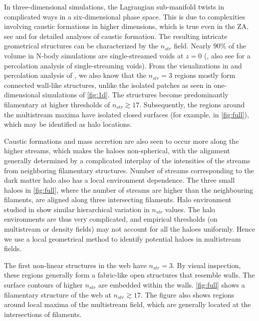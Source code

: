 \documentclass[fleqn,usenatbib,useAMS]{mnras}
\begin{document}
In three-dimensional simulations, the Lagrangian sub-manifold twists in complicated ways in a six-dimensional phase space. This is due to complexities involving caustic formations in higher dimensions, which is true even in the ZA, see \citealt{Arnold1982} and \citealt{Hidding2014} for detailed analyses of caustic formation. The resulting intricate geometrical structures can be characterized by the $n_{str}$ field. Nearly  $90\%$ of the volume in N-body simulations are single-streamed voids at $z=0$ (\citealt{Shandarin2012}, also see \citealt{Falck2015} for a percolation analysis of single-streaming voids). From the visualizations in \cite{Ramachandra2015} and percolation analysis of \cite{Ramachandra2017}, we also know that the $n_{str} = 3$ regions mostly form connected wall-like structures, unlike the isolated patches as seen in one-dimensional simulations of \autoref{fig:1d}. The structures become predominantly filamentary at higher thresholds of $ n_{str} \gtrsim 17$. Subsequently, the regions around the multistream maxima have isolated closed surfaces (for example, in \autoref{fig:full}), which may be identified as halo locations. 

Caustic formations and mass accretion are also seen to occur more along the higher streams, which makes the haloes non-spherical, with the alignment generally determined by a complicated interplay  of the intensities of the streams from neighboring filamentary structures. Number of streams corresponding to the dark matter halo also has a local environment dependence. The three small haloes in \autoref{fig:full}, where the number of streams are higher than the neighbouring filaments, are aligned along three intersecting filaments. Halo environment studied in \cite{Ramachandra2015} show similar hierarchical variation in $n_{str}$ values. The halo environments are thus very complicated, and empirical thresholds (on multistream or density fields) may not account for all the haloes uniformly. Hence we use a local geometrical method to identify potential haloes in multistream fields.


The first non-linear structures in the web have $n_{str} = 3$. By visual inspection, these regions generally form a fabric-like open structures that resemble walls. The surface contours of higher $n_{str}$ are embedded within the walls. \autoref{fig:full} shows a filamentary structure of the web at $n_{str} \gtrsim 17$. The figure also shows regions around local maxima of the multistream field, which are generally located at the intersections of filaments.    
\end{document}
